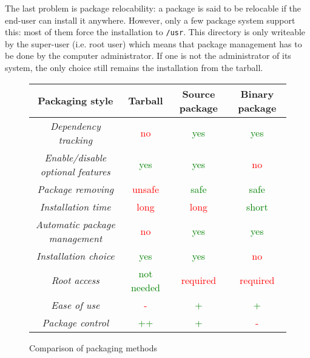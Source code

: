 The last problem is package relocability: a package is said to be
relocable if the end-user can install it anywhere. However, only a few
package system support this: most of them force the installation to
\texttt{/usr}. This directory is only writeable by the
super-user (i.e. root user) which means that package management has to
be done by the computer administrator. If one is not the administrator
of its system, the only choice still remains the installation from the
tarball.

\begin{figure}[htbp]
\centering

\begin{tabular}[htbp]{|c|c|c|c|}
  \hline
  Packaging style & \textbf{Tarball} & \textbf{Source package} & \textbf{Binary package}\\
  \hline
  \emph{Dependency tracking}
  & \textcolor{red}{no}
  & \textcolor{green}{yes}
  & \textcolor{green}{yes}
  \\
  \emph{Enable/disable optional features}
  & \textcolor{green}{yes}
  & \textcolor{green}{yes}
  & \textcolor{red}{no}
  \\
  \emph{Package removing}
  & \textcolor{red}{unsafe}
  & \textcolor{green}{safe}
  & \textcolor{green}{safe}
  \\
  \emph{Installation time}
  & \textcolor{red}{long}
  & \textcolor{red}{long}
  & \textcolor{green}{short}
  \\
  \emph{Automatic package management}
  & \textcolor{red}{no}
  & \textcolor{green}{yes}
  & \textcolor{green}{yes}
  \\
  \emph{Installation choice}
  & \textcolor{green}{yes}
  & \textcolor{green}{yes}
  & \textcolor{red}{no}
  \\
  \emph{Root access}
  & \textcolor{green}{not needed}
  & \textcolor{red}{required}
  & \textcolor{red}{required}
  \\
  \emph{Ease of use}
  & \textcolor{red}{-}
  & \textcolor{green}{+}
  & \textcolor{green}{+}
  \\
  \emph{Package control}
  & \textcolor{green}{++}
  & \textcolor{green}{+}
  & \textcolor{red}{-}
  \\
  \hline
\end{tabular}

\caption{Comparison of packaging methods}
\label{fig:package_comparison}
\end{figure}

